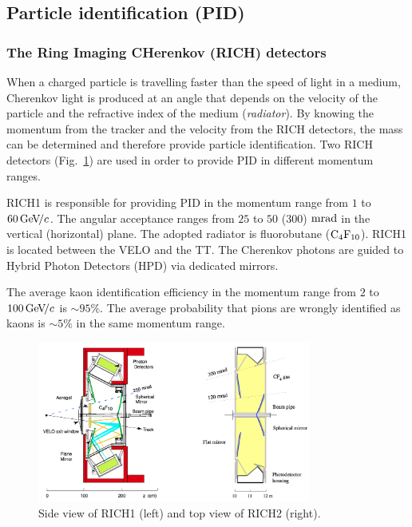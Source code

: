 \subsection{Particle identification (PID)}
\label{sec:pidintro}

\subsubsection*{The Ring Imaging CHerenkov (RICH) detectors}

When a charged particle is travelling faster than the speed of light in a medium, Cherenkov light is produced at an angle that depends on the velocity of the particle and the refractive index of the medium (\emph{radiator}). By knowing the momentum from the tracker and the velocity from the RICH detectors, the mass can be determined and therefore provide particle identification. Two RICH detectors \cite{RICH} (Fig.~\ref{fig:RICH}) are used in order to provide PID in different momentum ranges.

RICH1 is responsible for providing PID in the momentum range from $1$ to $60{\mathrm{\,Ge\kern -0.1em V\!/}c}$. The angular acceptance ranges from $25$ to
$50$ ($300$) $\rm mrad$ in the vertical (horizontal) plane. The adopted radiator is fluorobutane ($\rm C_4 F_{10}$). RICH1 is located between the VELO and the TT. 
The Cherenkov photons are guided to Hybrid Photon Detectors (HPD) via dedicated mirrors.

The average kaon identification efficiency in the momentum range from $2$ to $100{\mathrm{\,Ge\kern -0.1em V\!/}c}$ is $\sim95\%$. The average probability that pions are wrongly identified as kaons is $\sim5\%$ in the same momentum range.

\begin{figure}[t]
  \begin{center}
    \includegraphics[width=0.8\textwidth]{02LHCb/figs/RICH.png}
  \end{center}
  \vspace{-2.5mm}
  \caption{Side view of RICH1 (left) and top view of RICH2 (right).}
  \label{fig:RICH}
\end{figure}

